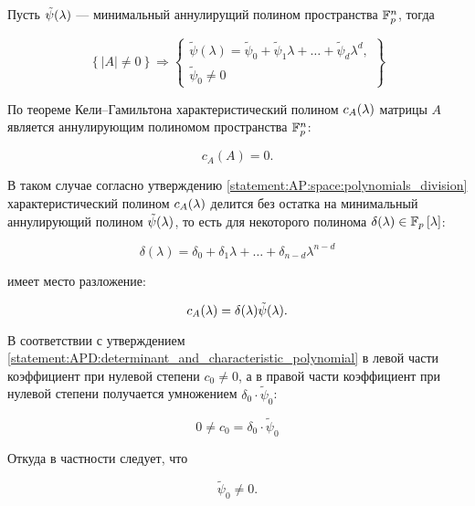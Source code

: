 \begin{statement} \label{statement:APD:determinant_and_minimal_space_annihilating_polynomial}
	Пусть $\tilde\psi (\lambda)$ --- минимальный аннулирущий полином пространства $\mathbb{F}^{n}_p$, тогда

		$$
			\left \{
				\left | A \right | \neq 0
			\right \}
			\Rightarrow
			\left \{
				\begin{array}{c}
					\tilde\psi(\lambda) = \tilde\psi_0 + \tilde\psi_1 \lambda + \dots + \tilde\psi_d \lambda^d,\\
					\tilde\psi_0 \neq 0
				\end{array}
			\right \}
		$$

	\proof

	По теореме Кели--Гамильтона \cite[с.~93]{Gantmacher} характеристический полином $c_A (\lambda)$ матрицы $A$ является аннулирующим
	полиномом пространства $\mathbb{F}^{n}_p$:

		$$ c_A ( A ) = 0. $$

	В таком случае согласно утверждению \ref{statement:AP:space:polynomials_division} характеристический полином $c_A (\lambda)$
	делится без остатка на минимальный аннулирующий полином	$\tilde\psi (\lambda)$, то есть для некоторого полинома
	$\delta (\lambda) \in \mathbb{F}_p \left [ \lambda \right ]$:

		$$ \delta(\lambda) = \delta_0 + \delta_1 \lambda + \dots + \delta_{n-d} \lambda^{n-d} $$

	 имеет место разложение:

		\begin{equation} \label{equation:APD:characteristic_polynomial_factorization}
			c_A (\lambda) = \delta (\lambda) \tilde\psi (\lambda).
		\end{equation}

	В соответствии с утверждением \ref{statement:APD:determinant_and_characteristic_polynomial} в левой части коэффициент при нулевой
	степени $c_0 \neq 0$, а в правой части коэффициент при нулевой степени получается умножением $\delta_0 \cdot \tilde\psi_0$:

		$$ 0 \neq c_0 = \delta_0 \cdot \tilde\psi_0 $$

	Откуда в частности следует, что

		$$ \tilde\psi_0 \neq 0. $$
\end{statement}

